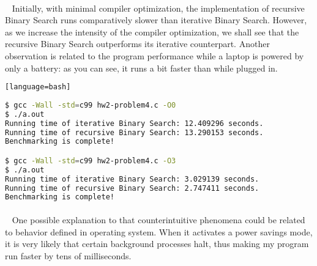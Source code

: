\documentclass{article}
\begin{document}
\paragraph{}\
	\rmfamily
	Initially, with minimal compiler optimization, the implementation of recursive Binary Search runs comparatively slower than iterative Binary Search.
	However, as we increase the intensity of the compiler optimization, we shall see that the recursive Binary Search outperforms its iterative counterpart. Another observation is related to the program performance while a laptop is powered by only a battery: as you can see, it runs a bit faster than while plugged in.

	\ttfamily
	\begin{lstlisting}[basicstyle=\small, language=bash][language=bash]	
	
$ gcc -Wall -std=c99 hw2-problem4.c -O0
$ ./a.out
Running time of iterative Binary Search: 12.409296 seconds.
Running time of recursive Binary Search: 13.290153 seconds.
Benchmarking is complete!

$ gcc -Wall -std=c99 hw2-problem4.c -O3
$ ./a.out
Running time of iterative Binary Search: 3.029139 seconds.
Running time of recursive Binary Search: 2.747411 seconds.
Benchmarking is complete!
	\end{lstlisting}
	
	\paragraph{}\
	\rmfamily
	One possible explanation to that counterintuitive phenomena could be related to behavior defined in operating system. When it activates a power savings mode, it is very likely that certain background processes halt, thus making my program run faster by tens of milliseconds.

\paragraph{}\
\paragraph{}\
\paragraph{}\
\paragraph{}\
\end{document}
